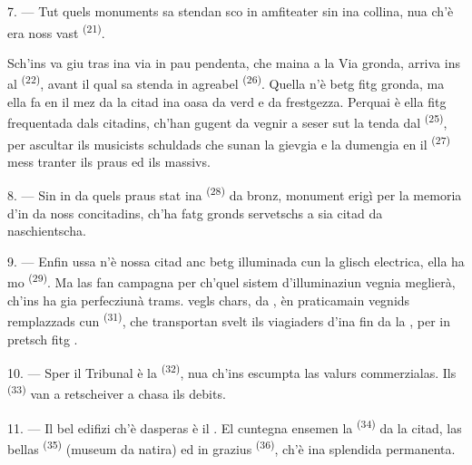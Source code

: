 7. --- Tut quels monuments sa stendan sco in amfiteater sin ina collina, nua ch'è era
noss vast  \textsuperscript{(21)}.

Sch'ins va giu tras ina via in pau pendenta, che maina a la Via gronda, arriva ins
al  \textsuperscript{(22)}, avant il qual sa stenda in agreabel  \textsuperscript{(26)}. Quella  n'è betg fitg gronda, ma
ella fa en il mez da la citad ina oasa da verd e da frestgezza. Perquai è ella fitg
frequentada dals citadins, ch'han gugent da vegnir a seser sut la tenda dal
 \textsuperscript{(25)}, per ascultar ils musicists schuldads che sunan la
gievgia e la dumengia en il  \textsuperscript{(27)} mess tranter ils praus ed
ils massivs.

8. --- Sin in da quels praus stat ina  \textsuperscript{(28)} da bronz,
monument erigì per la memoria d'in da noss concitadins, ch'ha fatg gronds servetschs
a sia citad da naschientscha.

\VUsaut{4.0mm}
\VUsaut{3.4mm}

9. --- Enfin ussa n'è nossa citad anc betg illuminada cun la glisch electrica, ella
ha mo  \textsuperscript{(29)}. Ma las  fan
campagna per ch'quel sistem d'illuminaziun vegnia meglierà,  ch'ins ha gia
perfecziunà  trams.  vegls chars,
 da , èn praticamain vegnids remplazzads cun  \textsuperscript{(31)}, che transportan svelt ils viagiaders d'ina fin da la
, per in pretsch fitg .

10. --- Sper il Tribunal è la  \textsuperscript{(32)}, nua ch'ins escumpta
las valurs commerzialas. Ils  \textsuperscript{(33)} van a
retscheiver a chasa ils debits.

\VUsaut{4.0mm}
\VUsaut{3.4mm}

11. --- Il bel edifizi ch'è dasperas è il . El cuntegna ensemen la
 \textsuperscript{(34)} da la citad, las bellas  \textsuperscript{(35)} (museum da natira) ed in grazius  \textsuperscript{(36)}, ch'è ina splendida  permanenta.

